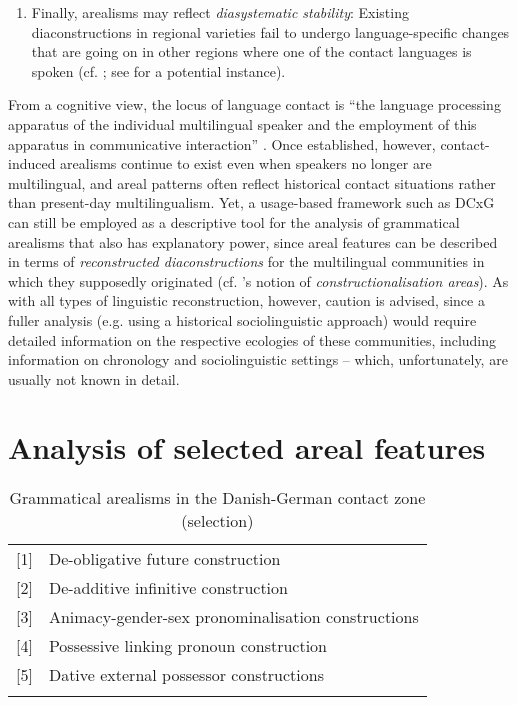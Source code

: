 \documentclass[output=paper]{langsci/langscibook}
\begin{document}
\begin{enumerate}
 \item Finally, arealisms may reflect \textit{diasystematic stability}: Existing diaconstructions in regional varieties fail to undergo language-specific changes that are going on in other regions where one of the contact languages is spoken (cf. \citealt{Kuehl.2014}; see  for a potential instance).
 
\end{enumerate}



From a cognitive view, the locus of language contact is “the language processing apparatus of the individual multilingual speaker and the employment of this apparatus in communicative interaction” \citep[3]{Matras.2020}. Once established, however, contact-induced arealisms continue to exist even when speakers no longer are multilingual, and areal patterns often reflect historical contact situations rather than present-day multilingualism. Yet, a usage-based framework such as DCxG can still be employed as a descriptive tool for the analysis of grammatical arealisms that also has explanatory power, since areal features can be described in terms of \textit{reconstructed diaconstructions} for the multilingual communities in which they supposedly originated (cf. \citeauthor{Holzl.2018}’s \citeyear{Holzl.2018} notion of \textit{constructionalisation areas}). As with all types of linguistic reconstruction, however, caution is advised, since a fuller analysis (e.g. using a historical sociolinguistic approach) would require detailed information on the respective ecologies of these communities, including information on chronology and sociolinguistic settings – which, unfortunately, are usually not known in detail.


\section{Analysis of selected areal features}
 \label{sec:hoeder:4}
\begin{table}[b]
\begin{tabularx}{\textwidth}{lQ}
\lsptoprule
{[1]} & {De-obligative future construction}\\
{[2]} & {De-additive infinitive construction}\\
{[3]} & {Animacy-gender-sex pronominalisation constructions}\\
{[4]} & {Possessive linking pronoun construction}\\
{[5]} & Dative external possessor constructions\\
\lspbottomrule
\end{tabularx}
\caption{Grammatical arealisms in the Danish-German contact zone (selection)\label{tab:hoeder:2}}
\end{table}
\end{document}
